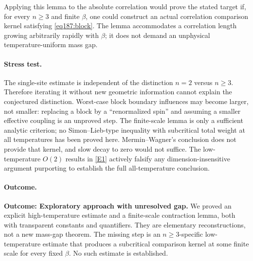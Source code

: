 \documentclass[11pt,a4paper]{article}
\newcommand{\eref}[2]{\hyperlink{extra:#1:#2}{[E#2]}}
\numberwithin{equation}{section}
\begin{document}
Applying this lemma to the absolute correlation would prove the stated target if, for every $n\ge3$ and finite $\beta$, one could construct an actual correlation comparison kernel satisfying \eqref{eq187:block}. The lemma accommodates a correlation length growing arbitrarily rapidly with $\beta$; it does not demand an unphysical temperature-uniform mass gap.

\paragraph{Stress test.}
The single-site estimate is independent of the distinction $n=2$ versus $n\ge3$. Therefore iterating it without new geometric information cannot explain the conjectured distinction. Worst-case block boundary influences may become larger, not smaller: replacing a block by a ``renormalized spin'' and assuming a smaller effective coupling is an unproved step. The finite-scale lemma is only a sufficient analytic criterion; no Simon--Lieb-type inequality with subcritical total weight at all temperatures has been proved here. Mermin--Wagner's conclusion does not provide that kernel, and slow decay to zero would not suffice. The low-temperature $O(2)$ results in \eref{187}{1} actively falsify any dimension-insensitive argument purporting to establish the full all-temperature conclusion.

\paragraph{Outcome.}
\textbf{Outcome: Exploratory approach with unresolved gap.}
We proved an explicit high-temperature estimate and a finite-scale contraction lemma, both with transparent constants and quantifiers. They are elementary reconstructions, not a new mass-gap theorem. The missing step is an $n\ge3$-specific low-temperature estimate that produces a subcritical comparison kernel at some finite scale for every fixed $\beta$. No such estimate is established.

\end{document}
